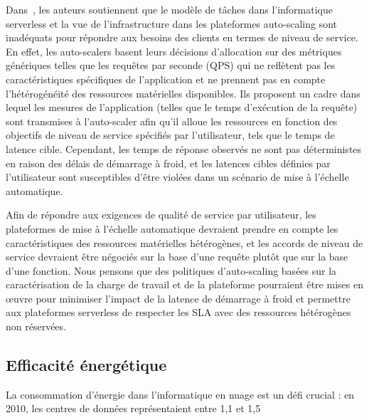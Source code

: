 Dans~\cite{choSLADrivenMLInference}, les auteurs soutiennent que le modèle de tâches dans l'informatique serverless et la vue de l'infrastructure dans les plateformes auto-scaling sont inadéquats pour répondre aux besoins des clients en termes de niveau de service. En effet, les auto-scalers basent leurs décisions d'allocation sur des métriques génériques telles que les requêtes par seconde (QPS) qui ne reflètent pas les caractéristiques spécifiques de l'application et ne prennent pas en compte l'hétérogénéité des ressources matérielles disponibles. Ils proposent un cadre dans lequel les mesures de l'application (telles que le temps d'exécution de la requête) sont transmises à l'auto-scaler afin qu'il alloue les ressources en fonction des objectifs de niveau de service spécifiés par l'utilisateur, tels que le temps de latence cible. Cependant, les temps de réponse observés ne sont pas déterministes en raison des délais de démarrage à froid, et les latences cibles définies par l'utilisateur sont susceptibles d'être violées dans un scénario de mise à l'échelle automatique.

Afin de répondre aux exigences de qualité de service par utilisateur, les plateformes de mise à l'échelle automatique devraient prendre en compte les caractéristiques des ressources matérielles hétérogènes, et les accords de niveau de service devraient être négociés sur la base d'une requête plutôt que sur la base d'une fonction. Nous pensons que des politiques d'auto-scaling basées sur la caractérisation de la charge de travail et de la plateforme pourraient être mises en œuvre pour minimiser l'impact de la latence de démarrage à froid et permettre aux plateformes serverless de respecter les SLA avec des ressources hétérogènes non réservées.

\subsection{Efficacité énergétique}

La consommation d'énergie dans l'informatique en nuage est un défi crucial : en 2010, les centres de données représentaient entre 1,1 et 1,5 %

